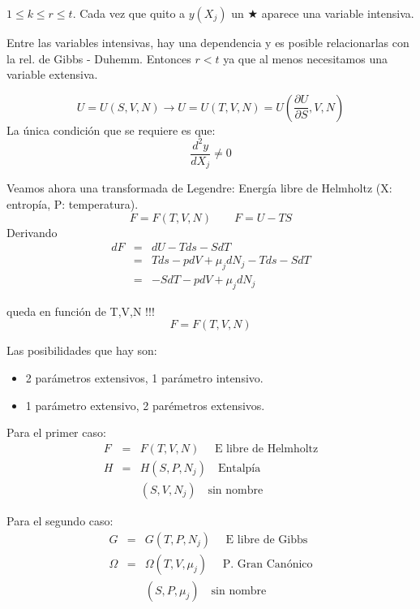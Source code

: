 \documentclass[10pt,twocolumn]{IEEEtran2e}
\newcommand{\ud}{\mathrm{d}}
\begin{document}
$1\leqslant k \leqslant r \leqslant t$. Cada vez que quito a $y(X_{j})$ un $\bigstar$ aparece una variable intensiva.

Entre las variables intensivas, hay una dependencia y es posible relacionarlas con la rel. de Gibbs - Duhemm. Entonces $r<t$ ya que al menos necesitamos una variable extensiva.

\begin{equation}
 U=U(S,V,N) \longrightarrow U=U(T,V,N) = U\left(\frac{\partial U}{\partial S},V,N\right)
\end{equation}
La \'unica condici\'on que se requiere es que:
\begin{equation}
 \frac{d^{2}y}{dX_{j}}\neq 0
\end{equation}

Veamos ahora una transformada de Legendre: Energ\'ia libre de Helmholtz (X: entrop\'ia, P: temperatura).
\begin{equation}
 F = F(T,V,N)\qquad F=U-TS
\end{equation}
Derivando
\begin{eqnarray}
 dF & = & dU-T ds - SdT \\
    & = & Tds - pdV + \mu_{j} dN_{j} - Tds - SdT \\
    & = & -S dT -pdV + \mu_{j}dN_{j} 
\end{eqnarray}

queda en funci\'on de T,V,N !!!
\begin{equation}
 F=F(T,V,N)
\end{equation}

Las posibilidades que hay son:\\
\begin{itemize}
 \item 2 par\'ametros extensivos, 1 par\'ametro intensivo.
 \item 1 par\'ametro extensivo, 2 par\'emetros extensivos.
\end{itemize}

Para el primer caso:
\begin{eqnarray}
 F & = & F(T,V,N) \quad \textrm{ E libre de Helmholtz}\\ 
 H & = & H(S,P,N_{j}) \quad \textrm{Entalp\'ia}\\
   &   & (S,V,N_{j}) \quad \textrm{sin nombre}
\end{eqnarray}

Para el segundo caso:
\begin{eqnarray}
 G & = & G(T,P,N_{j}) \quad \textrm{ E libre de Gibbs}\\ 
 \Omega & = & \Omega(T,V,\mu_{j}) \quad \textrm{ P. Gran Can\'onico}\\
   &   & (S,P,\mu_{j}) \quad \textrm{sin nombre}
\end{eqnarray}
\end{document}
